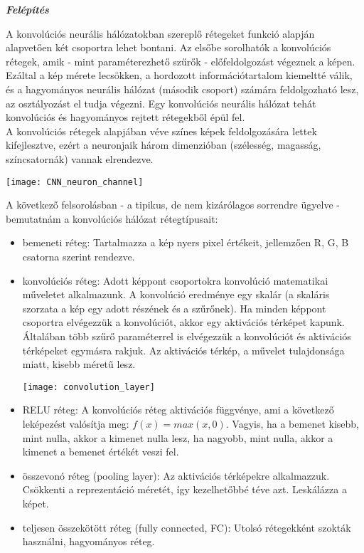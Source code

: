 \begin{flushleft}
\textit{\textbf{Felépítés}}
\end{flushleft}

A konvolúciós neurális hálózatokban szereplő rétegeket funkció alapján alapvetően két csoportra lehet bontani. Az elsőbe sorolhatók a konvolúciós rétegek, amik - mint paraméterezhető szűrők - előfeldolgozást végeznek a képen. Ezáltal a kép mérete lecsökken, a hordozott információtartalom kiemeltté válik, és a hagyományos neurális hálózat (második csoport) számára feldolgozható lesz, az osztályozást el tudja végezni. Egy konvolúciós neurális hálózat tehát konvolúciós és hagyományos rejtett rétegekből épül fel.\\

A konvolúciós rétegek alapjában véve színes képek feldolgozására lettek kifejlesztve, ezért a neuronjaik három dimenzióban (szélesség, magasság, színcsatornák) vannak elrendezve.\\

\begin{center}
\texttt{[image: CNN\_neuron\_channel]}
\end{center}

A következő felsorolásban - a tipikus, de nem kizárólagos sorrendre ügyelve - bemutatnám a konvolúciós hálózat rétegtípusait:\\
\begin{itemize}
\item bemeneti réteg: Tartalmazza a kép nyers pixel értékeit, jellemzően R, G, B csatorna szerint rendezve.
\item konvolúciós réteg: Adott képpont csoportokra konvolúció matematikai műveletet alkalmazunk. A konvolúció eredménye egy skalár (a skaláris szorzata a kép egy adott részének és a szűrőnek). Ha minden képpont csoportra elvégezzük a konvolúciót, akkor egy aktivációs térképet kapunk. Általában több szűrő paraméterrel is elvégezzük a konvolúciót és aktivációs térképeket egymásra rakjuk. Az aktivációs térkép, a művelet tulajdonsága miatt, kisebb
méretű lesz.

\begin{center}
\texttt{[image: convolution\_layer]}
\end{center}

\item RELU réteg: A konvolúciós réteg aktivációs függvénye, ami a következő leképezést valósítja meg: \(f(x) = max(x, 0)\). Vagyis, ha a bemenet kisebb, mint nulla, akkor a kimenet nulla lesz, ha nagyobb, mint nulla, akkor a kimenet a bemenet értékét veszi fel.
\item összevonó réteg (pooling layer): Az aktivációs térképekre alkalmazzuk. Csökkenti a reprezentáció méretét, így kezelhetőbbé téve azt. Leskálázza a képet.
\item teljesen összekötött réteg (fully connected, FC): Utolsó rétegekként szokták használni, hagyományos réteg. 
\end{itemize}

